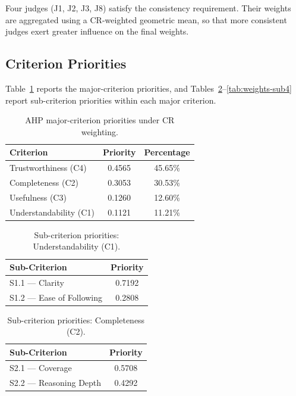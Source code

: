 Four judges (J1, J2, J3, J8) satisfy the consistency requirement. Their weights are
aggregated using a CR-weighted geometric mean, so that more consistent judges exert
greater influence on the final weights.

\subsection{Criterion Priorities}
\label{subsec:res-weights}

Table~\ref{tab:weights-main} reports the major-criterion priorities, and
Tables~\ref{tab:weights-sub1}--\ref{tab:weights-sub4} report sub-criterion
priorities within each major criterion.

\begin{table}[H]
  \centering
  \caption{AHP major-criterion priorities under CR weighting.}
  \label{tab:weights-main}
  \begin{tabular}{lcc}
    \toprule
    Criterion & Priority & Percentage \\
    \midrule
    Trustworthiness (C4)   & 0.4565 & 45.65\% \\
    Completeness (C2)      & 0.3053 & 30.53\% \\
    Usefulness (C3)        & 0.1260 & 12.60\% \\
    Understandability (C1) & 0.1121 & 11.21\% \\
    \bottomrule
  \end{tabular}
\end{table}

\begin{table}[H]
  \centering
  \caption{Sub-criterion priorities: Understandability (C1).}
  \label{tab:weights-sub1}
  \begin{tabular}{lc}
    \toprule
    Sub-Criterion & Priority \\
    \midrule
    S1.1 — Clarity           & 0.7192 \\
    S1.2 — Ease of Following & 0.2808 \\
    \bottomrule
  \end{tabular}
\end{table}

\begin{table}[H]
  \centering
  \caption{Sub-criterion priorities: Completeness (C2).}
  \label{tab:weights-sub2}
  \begin{tabular}{lc}
    \toprule
    Sub-Criterion & Priority \\
    \midrule
    S2.1 — Coverage        & 0.5708 \\
    S2.2 — Reasoning Depth & 0.4292 \\
    \bottomrule
  \end{tabular}
\end{table}

